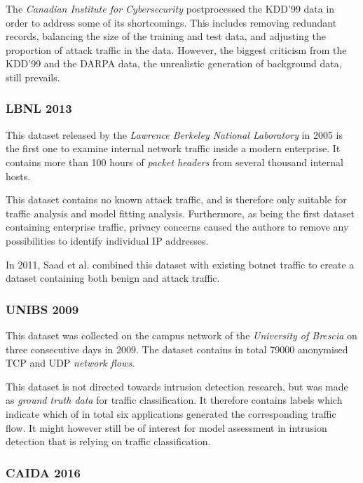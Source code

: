\documentclass[a4paper,12pt,twoside]{report}
\begin{document}
The \textit{Canadian Institute for Cybersecurity} postprocessed the KDD'99 data in order to address some of its shortcomings. This includes removing redundant records, balancing the size of the training and test data, and adjusting the proportion of attack traffic in the data. However, the biggest criticism from the KDD'99 and the DARPA data, the unrealistic generation of background data, still prevails.

\subsubsection*{LBNL 2013 \cite{pang2005first}}

This dataset released by the \textit{Lawrence Berkeley National Laboratory} in 2005 is the first one to examine internal network traffic inside a modern enterprise. It contains more than 100 hours of \textit{packet headers} from several thousand internal hosts. 

This dataset contains no known attack traffic, and is therefore only suitable for traffic analysis and model fitting analysis. Furthermore, as being the first dataset containing enterprise traffic, privacy concerns caused the authors to remove any possibilities to identify individual IP addresses.

In 2011, Saad et al. \cite{saad2011detecting} combined this dataset with existing botnet traffic to create a dataset containing both benign and attack traffic. 

\subsubsection*{UNIBS 2009\cite{UNIBS2009data}}

This dataset was collected on the campus network of the \textit{University of Brescia} on three consecutive days in 2009. The dataset contains in total 79000 anonymised TCP and UDP \textit{network flows}. 

This dataset is not directed towards intrusion detection research, but was made as \textit{ground truth data} for traffic classification. It therefore contains labels which indicate which of in total six applications generated the corresponding traffic flow. It might however still be of interest for model assessment in intrusion detection that is relying on traffic classification.

\subsubsection*{CAIDA 2016 \cite{walsworth2015caida}}
\end{document}

